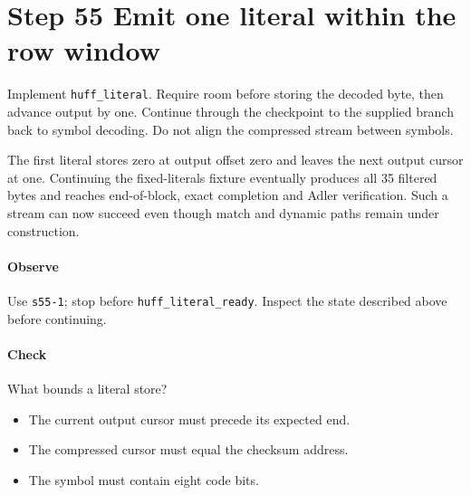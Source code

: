 \section{Step 55 Emit one literal within the row window}\label{png-huff-s55}
Implement \texttt{huff\_literal}. Require room before storing the decoded byte, then advance output by one. Continue through the checkpoint to the supplied branch back to symbol decoding. Do not align the compressed stream between symbols.

The first literal stores zero at output offset zero and leaves the next output cursor at one. Continuing the fixed-literals fixture eventually produces all 35 filtered bytes and reaches end-of-block, exact completion and Adler verification. Such a stream can now succeed even though match and dynamic paths remain under construction.

\paragraph{Observe} Use \texttt{s55-1}; stop before \texttt{huff\_literal\_ready}. Inspect the state described above before continuing.

\paragraph{Check} What bounds a literal store?
\begin{itemize}
  \item[A.] The current output cursor must precede its expected end.
  \item[B.] The compressed cursor must equal the checksum address.
  \item[C.] The symbol must contain eight code bits.
\end{itemize}
